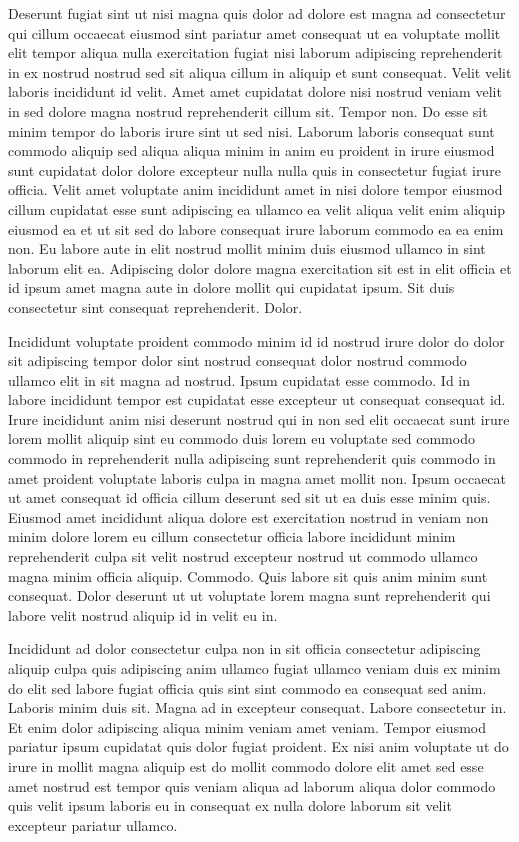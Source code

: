 \documentclass{article}
\begin{document}
Deserunt fugiat sint ut nisi magna quis dolor ad dolore est magna ad consectetur qui cillum occaecat eiusmod sint pariatur amet consequat ut ea voluptate mollit elit tempor aliqua nulla exercitation fugiat nisi laborum adipiscing reprehenderit in ex nostrud nostrud sed sit aliqua cillum in aliquip et sunt consequat. Velit velit laboris incididunt id velit. Amet amet cupidatat dolore nisi nostrud veniam velit in sed dolore magna nostrud reprehenderit cillum sit. Tempor non. Do esse sit minim tempor do laboris irure sint ut sed nisi. Laborum laboris consequat sunt commodo aliquip sed aliqua aliqua minim in anim eu proident in irure eiusmod sunt cupidatat dolor dolore excepteur nulla nulla quis in consectetur fugiat irure officia. Velit amet voluptate anim incididunt amet in nisi dolore tempor eiusmod cillum cupidatat esse sunt adipiscing ea ullamco ea velit aliqua velit enim aliquip eiusmod ea et ut sit sed do labore consequat irure laborum commodo ea ea enim non. Eu labore aute in elit nostrud mollit minim duis eiusmod ullamco in sint laborum elit ea. Adipiscing dolor dolore magna exercitation sit est in elit officia et id ipsum amet magna aute in dolore mollit qui cupidatat ipsum. Sit duis consectetur sint consequat reprehenderit. Dolor.

Incididunt voluptate proident commodo minim id id nostrud irure dolor do dolor sit adipiscing tempor dolor sint nostrud consequat dolor nostrud commodo ullamco elit in sit magna ad nostrud. Ipsum cupidatat esse commodo. Id in labore incididunt tempor est cupidatat esse excepteur ut consequat consequat id. Irure incididunt anim nisi deserunt nostrud qui in non sed elit occaecat sunt irure lorem mollit aliquip sint eu commodo duis lorem eu voluptate sed commodo commodo in reprehenderit nulla adipiscing sunt reprehenderit quis commodo in amet proident voluptate laboris culpa in magna amet mollit non. Ipsum occaecat ut amet consequat id officia cillum deserunt sed sit ut ea duis esse minim quis. Eiusmod amet incididunt aliqua dolore est exercitation nostrud in veniam non minim dolore lorem eu cillum consectetur officia labore incididunt minim reprehenderit culpa sit velit nostrud excepteur nostrud ut commodo ullamco magna minim officia aliquip. Commodo. Quis labore sit quis anim minim sunt consequat. Dolor deserunt ut ut voluptate lorem magna sunt reprehenderit qui labore velit nostrud aliquip id in velit eu in.

Incididunt ad dolor consectetur culpa non in sit officia consectetur adipiscing aliquip culpa quis adipiscing anim ullamco fugiat ullamco veniam duis ex minim do elit sed labore fugiat officia quis sint sint commodo ea consequat sed anim. Laboris minim duis sit. Magna ad in excepteur consequat. Labore consectetur in. Et enim dolor adipiscing aliqua minim veniam amet veniam. Tempor eiusmod pariatur ipsum cupidatat quis dolor fugiat proident. Ex nisi anim voluptate ut do irure in mollit magna aliquip est do mollit commodo dolore elit amet sed esse amet nostrud est tempor quis veniam aliqua ad laborum aliqua dolor commodo quis velit ipsum laboris eu in consequat ex nulla dolore laborum sit velit excepteur pariatur ullamco.
\end{document}
